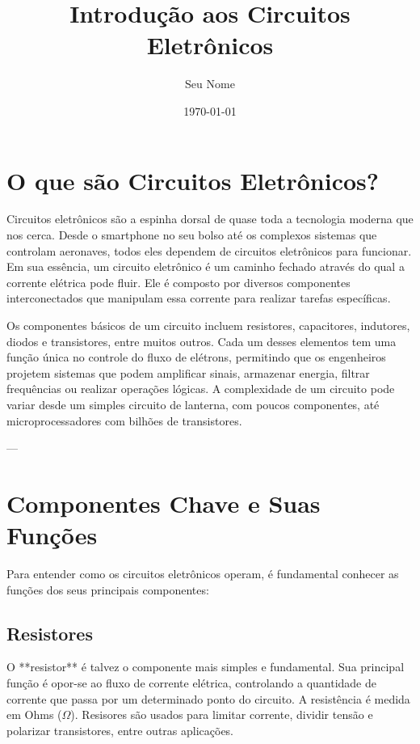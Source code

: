 \documentclass{article}
\title{Introdução aos Circuitos Eletrônicos}
\author{Seu Nome}
\date{\today} %
\begin{document}
\maketitle

\section*{O que são Circuitos Eletrônicos?}
Circuitos eletrônicos são a espinha dorsal de quase toda a tecnologia moderna que nos cerca. Desde o smartphone no seu bolso até os complexos sistemas que controlam aeronaves, todos eles dependem de circuitos eletrônicos para funcionar. Em sua essência, um circuito eletrônico é um caminho fechado através do qual a corrente elétrica pode fluir. Ele é composto por diversos componentes interconectados que manipulam essa corrente para realizar tarefas específicas.

Os componentes básicos de um circuito incluem resistores, capacitores, indutores, diodos e transistores, entre muitos outros. Cada um desses elementos tem uma função única no controle do fluxo de elétrons, permitindo que os engenheiros projetem sistemas que podem amplificar sinais, armazenar energia, filtrar frequências ou realizar operações lógicas. A complexidade de um circuito pode variar desde um simples circuito de lanterna, com poucos componentes, até microprocessadores com bilhões de transistores.

---

\section*{Componentes Chave e Suas Funções}
Para entender como os circuitos eletrônicos operam, é fundamental conhecer as funções dos seus principais componentes:

\subsection*{Resistores}
O **resistor** é talvez o componente mais simples e fundamental. Sua principal função é opor-se ao fluxo de corrente elétrica, controlando a quantidade de corrente que passa por um determinado ponto do circuito. A resistência é medida em Ohms ($\Omega$). Resisores são usados para limitar corrente, dividir tensão e polarizar transistores, entre outras aplicações.
\end{document}
